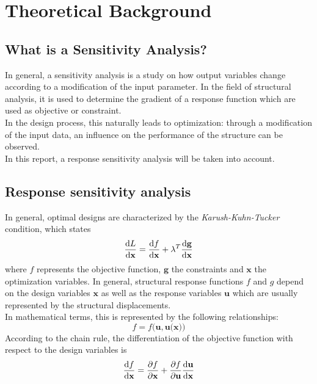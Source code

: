 
\section{Theoretical Background}
\subsection{What is a Sensitivity Analysis?}
In general, a sensitivity analysis is a study on how output variables change according to a modification of the input parameter. In the field of structural analysis, it is used to determine the gradient of a response function which are used as objective or constraint. \\[6pt]
In the design process, this naturally leads to optimization: through a modification of the input data, an influence on the performance of the structure can be observed. \\[6pt]
In this report, a response sensitivity analysis will be taken into account.\\

\subsection{Response sensitivity analysis}
In general, optimal designs are characterized by the \textit{Karush-Kuhn-Tucker} condition, which states
\begin{equation}
\dv{L}{\textbf{x}} = \dv{f}{\textbf{x}} + \lambda^T  \dv{\textbf{g}}{\textbf{x}} 
\end{equation}
where $f$ represents the objective function, $\textbf{g}$ the constraints and $\textbf{x}$ the optimization variables.
In general, structural response functions $f$ and $g$ depend on the design variables $\textbf{x}$ as well as the response variables $\textbf{u}$ which are usually represented by the structural displacements. \\
In mathematical terms, this is represented by the following relationships: 
\begin{equation}
f = f \big(\textbf{u}, \textbf{u(x)}\big)
\end{equation}
According to the chain rule, the differentiation of the objective function with respect to the design variables is
\begin{equation}
\dv{f}{\textbf{x}} = \pdv{f}{\textbf{x}} + \pdv{f}{\textbf{u}} \dv{\textbf{u}}{\textbf{x}}
\end{equation}

